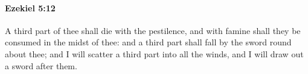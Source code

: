
		\paragraph{Ezekiel 5:12} %
			\label{EZEKIEL-5-12}

			A third part of thee shall die with the pestilence, and with famine shall they be consumed in the midst of thee: and a third part shall fall by the sword round about thee; and I will scatter a third part into all the winds, and I will draw out a sword after them.


